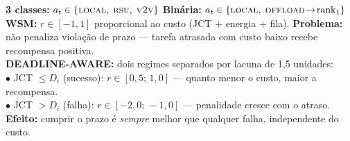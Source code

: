\documentclass{beamer}
\begin{document}
{\begin{frame}[plain, t]
\vspace{0.18cm}
\hspace{0.3cm}
\begin{minipage}{0.94\textwidth}
{\tiny\ttfamily
\textbf{3 classes:} $a_t \in \{\textsc{local},\;\textsc{rsu},\;\textsc{v2v}\}$ \quad\textbf{Binária:} $a_t \in \{\textsc{local},\;\textsc{offload}\!\to\!\text{rank}_1\}$\\[5pt]
\textbf{WSM:} $r \in [-1,1]$ proporcional ao custo (JCT + energia + fila). \textbf{Problema:} não penaliza
violação de prazo — tarefa atrasada com custo baixo recebe recompensa positiva.\\[5pt]
\textbf{DEADLINE-AWARE:} dois regimes separados por lacuna de 1,5 unidades:\\
\quad $\bullet$ JCT $\leq D_i$ (sucesso): $r \in [0{,}5;\,1{,}0]$ — quanto menor o custo, maior a recompensa.\\
\quad $\bullet$ JCT $> D_i$ (falha): $r \in [-2{,}0;\,-1{,}0]$ — penalidade cresce com o atraso.\\
\textbf{Efeito:} cumprir o prazo é \textit{sempre} melhor que qualquer falha, independente do custo.
}
\end{minipage}

\end{frame}
}
\end{document}
